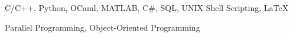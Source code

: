 

\begin{cventries}

\cvskills
  {
    \begin{cvitems} %
      \item {C/C++, Python, OCaml, MATLAB, C\#, SQL, UNIX Shell Scripting, LaTeX} %
      \item {Parallel Programming, Object-Oriented Programming}
    \end{cvitems}
  }
\end{cventries}
